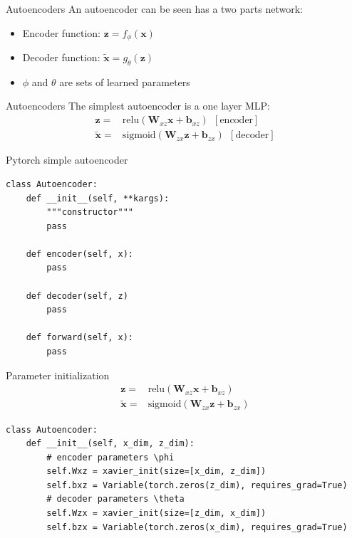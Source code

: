 \documentclass{beamer}
\newcommand{\relu}{\mathrm{relu}}
\newcommand{\sig}{\mathrm{sigmoid}}
\begin{document}
\begin{frame}{Autoencoders}
An autoencoder can be seen has a two parts network:
\begin{itemize}
	\item Encoder function: $\bm{z}=f_\phi(\bm{x})$ \pause
	\item Decoder function: $\tilde{\bm{x}} = g_\theta(\bm{z})$ \pause
	\item $\phi$ and $\theta$ are sets of learned parameters
\end{itemize}
\end{frame}

\begin{frame}{Autoencoders}
	The simplest autoencoder is a one layer MLP:
	\Large
	\begin{equation}
	\begin{split}
		\mathbf{z} =& \relu\left(\mathbf{W}_{xz}\mathbf{x}+\mathbf{b}_{xz}\right)~~[\text{encoder}]\\
		\tilde{\mathbf{x}} =& \sig\left(\mathbf{W}_{zx}\mathbf{z}+\mathbf{b}_{zx}\right)~~[\text{decoder}]
	\end{split}
	\end{equation}
\end{frame}

\begin{frame}[fragile]{Pytorch simple autoencoder}
\begin{verbatim}
class Autoencoder:
	def __init__(self, **kargs):
	    """constructor"""
	    pass
	
	def encoder(self, x):
	    pass
	
	def decoder(self, z)
	    pass
	    
	def forward(self, x):
	    pass
\end{verbatim}
\end{frame}

\begin{frame}[fragile]{Parameter initialization}
\begin{equation}
\begin{split}
\mathbf{z} =& \relu\left(\mathbf{W}_{xz}\mathbf{x}+\mathbf{b}_{xz}\right)\\
\tilde{\mathbf{x}} =& \sig\left(\mathbf{W}_{zx}\mathbf{z}+\mathbf{b}_{zx}\right) 
\end{split}
\end{equation}
\begin{verbatim}
class Autoencoder:
    def __init__(self, x_dim, z_dim):
        # encoder parameters \phi
        self.Wxz = xavier_init(size=[x_dim, z_dim])
        self.bxz = Variable(torch.zeros(z_dim), requires_grad=True)
        # decoder parameters \theta
        self.Wzx = xavier_init(size=[z_dim, x_dim])
        self.bzx = Variable(torch.zeros(x_dim), requires_grad=True)
\end{verbatim}
\end{frame}
\end{document}
